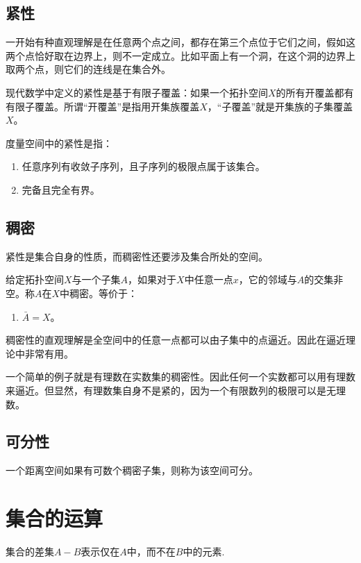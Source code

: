 \subsection{紧性}
一开始有种直观理解是在任意两个点之间，都存在第三个点位于它们之间，假如这两个点恰好取在边界上，则不一定成立。比如平面上有一个洞，在这个洞的边界上取两个点，则它们的连线是在集合外。

现代数学中定义的紧性是基于有限子覆盖：如果一个拓扑空间$X$的所有开覆盖都有有限子覆盖。所谓“开覆盖”是指用开集族覆盖$X$，“子覆盖”就是开集族的子集覆盖$X$。

度量空间中的紧性是指：
\begin{enumerate}
\item 任意序列有收敛子序列，且子序列的极限点属于该集合。
\item 完备且完全有界。
\end{enumerate}

\subsection{稠密}
紧性是集合自身的性质，而稠密性还要涉及集合所处的空间。
\begin{definition}[稠密性]{}
给定拓扑空间$X$与一个子集$A$，如果对于$X$中任意一点$x$，它的邻域与$A$的交集非空。称$A$在$X$中稠密。等价于：

\begin{enumerate}
\item $\bar{A}=X$。
\end{enumerate}
\end{definition}

稠密性的直观理解是全空间中的任意一点都可以由子集中的点逼近。因此在逼近理论中非常有用。

一个简单的例子就是有理数在实数集的稠密性。因此任何一个实数都可以用有理数来逼近。但显然，有理数集自身不是紧的，因为一个有限数列的极限可以是无理数。

\subsection{可分性}
\begin{definition}[可分性]{}
一个距离空间如果有可数个稠密子集，则称为该空间可分。
\end{definition}

\section{集合的运算}
集合的差集$A-B$表示仅在$A$中，而不在$B$中的元素.

